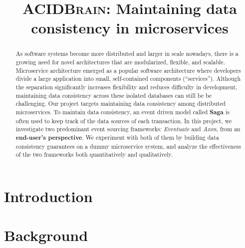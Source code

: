\documentclass[journal,11pt,onecolumn,draftclsnofoot]{assets/IEEEtran}
\begin{document}
\title{\textsc{ACIDBrain}: Maintaining data consistency in microservices}

\author{

}

\maketitle


\begin{abstract}
    As software systems become more distributed and larger in scale nowadays, there is a growing need for novel architectures that are modularized, flexible, and scalable. Microservice architecture emerged as a popular software architecture where developers divide a large application into small, self-contained components (“services”). Although the separation significantly increases flexibility and reduces difficulty in development, maintaining data consistency across these isolated databases can still be be challenging. Our project targets maintaining data consistency among distributed microservices. To maintain data consistency, an event driven model called \textbf{Saga}\cite{garcia1987sagas} is often used to keep track of the data sources of each transaction. In this project, we investigate two predominant event sourcing frameworks: \textit{Eventuate} and \textit{Axon}, from an \textbf{end-user’s perspective}. We experiment with both of them by building data consistency guarantees on a dummy microservice system, and analyze the effectiveness of the two frameworks both quantitatively and qualitatively.
\end{abstract}



\section{Introduction}


\section{Background}

\end{document}
